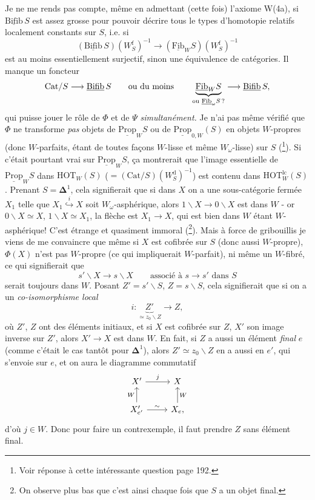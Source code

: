 \documentclass[11pt]{article}
\newcommand{\printedpage}[1]{\marginpar{\footnotesize p.~#1}}
\newcommand{\msp}[1]{\marginpar{\footnotesize [#1]}}
\newcommand{\Fib}{\underline{\mathrm{Fib}}}
\newcommand{\Prop}{\underline{\mathrm{Prop}}}
\newcommand{\Bifib}{\underline{\mathrm{Bifib}}}
\newcommand{\HOT}{\mathrm{HOT}}
\begin{document}
Je ne me rends pas compte, même en admettant (cette fois) l'axiome W(4a), si $\Bifib\, S$ est assez grosse pour pouvoir décrire tous le types d'homotopie relatifs localement constants sur $S$, i.e. si %
\[ (\Bifib\, S)(W^{\mathrm{f}}_S)^{-1} \longrightarrow (\Fib_W S)(W^{\mathrm{f}}_S)^{-1} \]
est au moins essentiellement surjectif, sinon une équivalence de catégories. Il manque un foncteur
\[ \mathrm{Cat}/S \longrightarrow \Bifib\, S \qquad \text{ou du moins} \qquad \underbrace{\Fib_W S}_{\text{ou $\Fib_\omega S$\,?}} \longrightarrow \Bifib\, S, \]
\printedpage{116}
qui puisse jouer le rôle de $\Phi$ et de $\Psi$ \textit{simultané\msp{page 187}ment.} Je n'ai pas même vérifié que $\Phi$ ne transforme \textit{pas} objets de $\Prop_W S$ ou de $\Prop_{0,W}(S)$ en objets $W$-propres (donc $W$-parfaits, étant de toutes façons $W$-lisse et même $W_\omega$-lisse) sur $S$ (\footnote{Voir réponse à cette intéressante question page 192.}). Si c'était pourtant vrai sur $\Prop_W S$, ça montrerait que l'image essentielle de $\Prop_W S$ dans $\HOT_W(S)$ ($= (\mathrm{Cat}/S)(W^{\mathrm{d}}_S)^{-1}$) est contenu dans $\HOT^{\mathrm{lc}}_W(S)$. %
Prenant $S = \mathbf{\Delta}^1$, cela signifierait que si dans $X$ on a une sous-catégorie fermée $X_1$ telle que $X_1 \overset{i}{\hookrightarrow} X$ soit $W_\omega$-asphérique, alors $1\backslash X \longrightarrow 0\backslash X$ est dans $W$ - or $0\backslash X \simeq X$, $1\backslash X \simeq X_1$, la flèche est $X_1 \longrightarrow X$, qui est bien dans $W$ étant $W$-asphérique! C'est étrange et quasiment immoral (\footnote{On observe plus bas que c'est ainsi chaque fois que $S$ a un objet final.}). Mais à force de gribouillis je viens de me convaincre que même si $X$ est cofibrée sur $S$ (donc aussi $W$-propre), $\Phi(X)$ n'est pas $W$-propre (ce qui impliquerait $W$-parfait), ni
\msp{page 188}
même un $W$-fibré, ce qui signifierait que
\[ s'\backslash X \longrightarrow s\backslash X \qquad \text{associé à } s \longrightarrow s' \text{ dans } S \]
serait toujours dans $W$. Posant $Z' = s'\backslash S$, $Z = s\backslash S$, cela signifierait que si on a un \textit{co-isomorphisme local}
\[ i : \underbrace{Z'}_{\simeq z_0\backslash Z} \longrightarrow Z, \]
où $Z'$, $Z$ ont des éléments initiaux, et si $X$ est cofibrée sur $Z$, $X'$ son image inverse sur $Z'$, alors $X' \longrightarrow X$ est dans $W$. En fait, si $Z$ a aussi un élément \textit{final} $e$ (comme c'était le cas tantôt pour $\mathbf{\Delta}^1$), alors $Z' \simeq z_0\backslash Z$ en a aussi en $e'$, qui s'envoie sur $e$, et on aura le diagramme commutatif
\[
\begin{tikzcd}
X' \arrow[r, "j"] & X \\
X'_{e'} \arrow[u, "W"] \arrow[r, "\sim"] & X_e, \arrow[u, "W"']
\end{tikzcd}
\]
d'où $j \in W$. Donc pour faire un contrexemple,
\msp{page 189}
il faut prendre $Z$ sans élément final.
\end{document}
